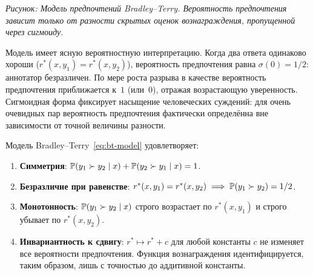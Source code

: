 
\begin{center}
\small\textit{Рисунок: Модель предпочтений Bradley--Terry. Вероятность предпочтения зависит только от разности скрытых оценок вознаграждения, пропущенной через сигмоиду.}
\end{center}

Модель имеет ясную вероятностную интерпретацию. Когда два ответа одинаково хороши ($r^*(x,y_1) = r^*(x,y_2)$), вероятность предпочтения равна $\sigma(0) = 1/2$: аннотатор безразличен. По мере роста разрыва в качестве вероятность предпочтения приближается к~$1$ (или~$0$), отражая возрастающую уверенность. Сигмоидная форма фиксирует насыщение человеческих суждений: для очень очевидных пар вероятность предпочтения фактически определённа вне зависимости от точной величины разности.

\begin{proposition}
\label{prop:bt-properties}
Модель Bradley--Terry~\eqref{eq:bt-model} удовлетворяет:
\begin{enumerate}
  \item \textbf{Симметрия}: $\mathbb{P}(y_1 \succ y_2 \mid x) + \mathbb{P}(y_2 \succ y_1 \mid x) = 1$.
  \item \textbf{Безразличие при равенстве}: $r^*(x,y_1) = r^*(x,y_2) \implies \mathbb{P}(y_1 \succ y_2) = 1/2$.
  \item \textbf{Монотонность}: $\mathbb{P}(y_1 \succ y_2 \mid x)$ строго возрастает по $r^*(x,y_1)$ и строго убывает по $r^*(x,y_2)$.
  \item \textbf{Инвариантность к сдвигу}: $r^* \mapsto r^* + c$ для любой константы $c$ не изменяет все вероятности предпочтения. Функция вознаграждения идентифицируется, таким образом, лишь с точностью до аддитивной константы.
\end{enumerate}
\end{proposition}

